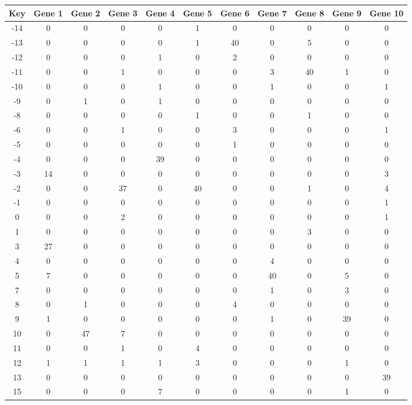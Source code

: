 \begin{tabular}{|c|c|c|c|c|c|c|c|c|c|c|}
\hline
Key & Gene 1 & Gene 2 & Gene 3 & Gene 4 & Gene 5 & Gene 6 & Gene 7 & Gene 8 & Gene 9 & Gene 10 \\
\hline
-14 & 0 & 0 & 0 & 0 & 1 & 0 & 0 & 0 & 0 & 0 \\
-13 & 0 & 0 & 0 & 0 & 1 & 40 & 0 & 5 & 0 & 0 \\
-12 & 0 & 0 & 0 & 1 & 0 & 2 & 0 & 0 & 0 & 0 \\
-11 & 0 & 0 & 1 & 0 & 0 & 0 & 3 & 40 & 1 & 0 \\
-10 & 0 & 0 & 0 & 1 & 0 & 0 & 1 & 0 & 0 & 1 \\
-9 & 0 & 1 & 0 & 1 & 0 & 0 & 0 & 0 & 0 & 0 \\
-8 & 0 & 0 & 0 & 0 & 1 & 0 & 0 & 1 & 0 & 0 \\
-6 & 0 & 0 & 1 & 0 & 0 & 3 & 0 & 0 & 0 & 1 \\
-5 & 0 & 0 & 0 & 0 & 0 & 1 & 0 & 0 & 0 & 0 \\
-4 & 0 & 0 & 0 & 39 & 0 & 0 & 0 & 0 & 0 & 0 \\
-3 & 14 & 0 & 0 & 0 & 0 & 0 & 0 & 0 & 0 & 3 \\
-2 & 0 & 0 & 37 & 0 & 40 & 0 & 0 & 1 & 0 & 4 \\
-1 & 0 & 0 & 0 & 0 & 0 & 0 & 0 & 0 & 0 & 1 \\
0 & 0 & 0 & 2 & 0 & 0 & 0 & 0 & 0 & 0 & 1 \\
1 & 0 & 0 & 0 & 0 & 0 & 0 & 0 & 3 & 0 & 0 \\
3 & 27 & 0 & 0 & 0 & 0 & 0 & 0 & 0 & 0 & 0 \\
4 & 0 & 0 & 0 & 0 & 0 & 0 & 4 & 0 & 0 & 0 \\
5 & 7 & 0 & 0 & 0 & 0 & 0 & 40 & 0 & 5 & 0 \\
7 & 0 & 0 & 0 & 0 & 0 & 0 & 1 & 0 & 3 & 0 \\
8 & 0 & 1 & 0 & 0 & 0 & 4 & 0 & 0 & 0 & 0 \\
9 & 1 & 0 & 0 & 0 & 0 & 0 & 1 & 0 & 39 & 0 \\
10 & 0 & 47 & 7 & 0 & 0 & 0 & 0 & 0 & 0 & 0 \\
11 & 0 & 0 & 1 & 0 & 4 & 0 & 0 & 0 & 0 & 0 \\
12 & 1 & 1 & 1 & 1 & 3 & 0 & 0 & 0 & 1 & 0 \\
13 & 0 & 0 & 0 & 0 & 0 & 0 & 0 & 0 & 0 & 39 \\
15 & 0 & 0 & 0 & 7 & 0 & 0 & 0 & 0 & 1 & 0 \\
\hline
\end{tabular}